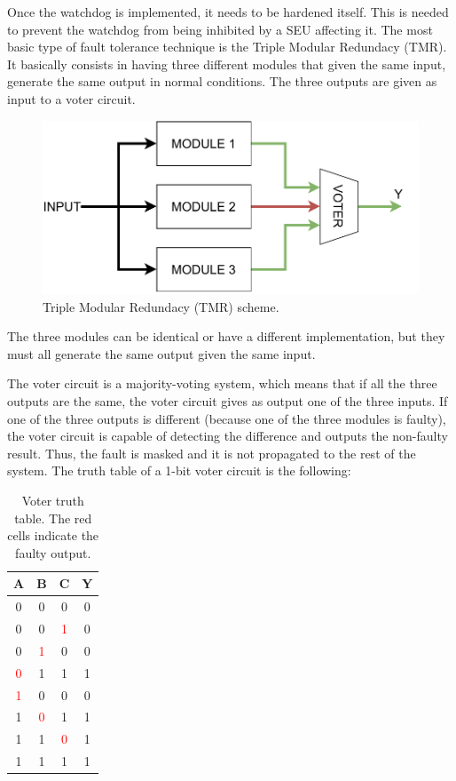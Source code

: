 Once the watchdog is implemented, it needs to be hardened itself. This is needed to prevent the watchdog from being inhibited by a SEU affecting it. The most basic type of fault tolerance technique is the Triple Modular Redundacy (TMR). It basically consists in having three different modules that given the same input, generate the same output in normal conditions. The three outputs are given as input to a voter circuit.

\begin{figure}[H]
\centering
\includegraphics[width=0.9\linewidth]{images/chapter4/tmr.pdf}
\caption{Triple Modular Redundacy (TMR) scheme.}
\label{fig:tmr_scheme}
\end{figure}

The three modules can be identical or have a different implementation, but they must all generate the same output given the same input. \bigskip

The voter circuit is a majority-voting system, which means that if all the three outputs are the same, the voter circuit gives as output one of the three inputs. If one of the three outputs is different (because one of the three modules is faulty), the voter circuit is capable of detecting the difference and outputs the non-faulty result. Thus, the fault is masked and it is not propagated to the rest of the system. The truth table of a 1-bit voter circuit is the following:

\begin{table}[H]
\centering
\begin{tabular}{ ccc|c }
    \textbf{A}&\textbf{B}&\textbf{C}&\textbf{Y}\\
    \hline
    0&0&0&0\\
    0&0&\textcolor{red}1&0\\
    0&\textcolor{red}1&0&0\\
    \textcolor{red}0&1&1&1\\
    \textcolor{red}1&0&0&0\\
    1&\textcolor{red}0&1&1\\
    1&1&\textcolor{red}0&1\\
    1&1&1&1\\
\end{tabular}
\caption{Voter truth table. The red cells indicate the faulty output.}
\end{table}

